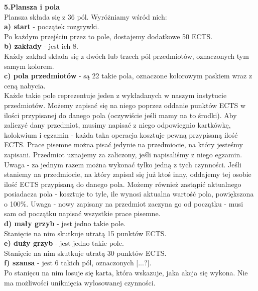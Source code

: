 \documentclass[a4paper]{article}
\begin{document}
\noindent \textbf{5.Plansza i pola}\\
Plansza składa się z 36 pól. Wyróżniamy wśród nich:\\
\noindent \textbf{a) start} - początek rozgrywki.\\ 
\indent Po każdym przejściu przez to pole, dostajemy dodatkowe 50 ECTS.\\
\noindent \textbf{b) zakłady} - jest ich 8.\\
\indent Każdy zakład składa się z dwóch lub trzech pól przedmiotów, oznaczonych tym samym kolorem.\\
\noindent \textbf{c) pola przedmiotów} - są 22 takie pola, oznaczone kolorowym paskiem wraz z ceną nabycia.\\ \indent Każde takie pole reprezentuje jeden z wykładanych w naszym instytucie przedmiotów. Możemy zapisać się na niego poprzez oddanie punktów ECTS w ilości przypisanej do danego pola (oczywiście jeśli mamy na to środki). Aby zaliczyć dany przedmiot, musimy napisać z niego odpowiegnio kartkówkę, kolokwium i egzamin - każda taka operacja kosztuje pewną przypisaną ilość ECTS. Prace pisemne można pisać jedynie na przedmiocie, na który jesteśmy zapisani. Przedmiot uznajemy za zaliczony, jeśli napisaliśmy z niego egzamin. Uwaga - za jednym razem można wykonać tylko jedną z tych czynności. Jeśli staniemy na przedmiocie, na który zapisał się już ktoś inny, oddajemy tej osobie ilość ECTS przypisaną do danego pola. Możemy również zastąpić aktualnego posiadacza pola - kosztuje to tyle, ile wynosi aktualna wartość pola, powiększona o 100\%. Uwaga - nowy zapisany na przedmiot zaczyna go od początku - musi sam od początku napisać wszystkie prace pisemne.\\ 
\noindent \textbf{d) mały grzyb} - jest jedno takie pole.\\
\indent Stanięcie na nim skutkuje utratą 15 punktów ECTS.\\
\noindent \textbf{e) duży grzyb} - jest jedno takie pole.\\
\indent Stanięcie na nim skutkuje utratą 30 punktów ECTS.\\
\noindent \textbf{f) szansa} - jest 6 takich pól, oznaczonych [...?]. \\
\indent Po stanięcu na nim losuje się karta, która wskazuje, jaka akcja się wykona. Nie ma możliwości uniknięcia wylosowanej czynności.\\
\end{document}
